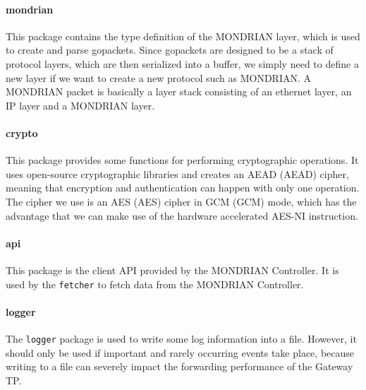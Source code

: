 \paragraph{mondrian} This package contains the type definition of the MONDRIAN layer, which is used to create and parse gopackets. Since gopackets are designed to be a stack of protocol layers, which are then serialized into a buffer, we simply need to define a new layer if we want to create a new protocol such as MONDRIAN. A MONDRIAN packet is basically a layer stack consisting of an ethernet layer, an \acs{IP} layer and a MONDRIAN layer.

\paragraph{crypto} This package provides some functions for performing cryptographic operations. It uses open-source cryptographic libraries and creates an \acs{AEAD} (\acl{AEAD}) cipher, meaning that encryption and authentication can happen with only one operation. The cipher we use is an \acs{AES} (\acl{AES}) cipher in \acs{GCM} (\acl{GCM}) mode, which has the advantage that we can make use of the hardware accelerated \acs{AES-NI} instruction.

\paragraph{api} This package is the client \acs{API} provided by the MONDRIAN Controller. It is used by the \texttt{fetcher} to fetch data from the MONDRIAN Controller.

\paragraph{logger} The \texttt{logger} package is used to write some log information into a file. However, it should only be used if important and rarely occurring events take place, because writing to a file can severely impact the forwarding performance of the Gateway \acs{TP}.




